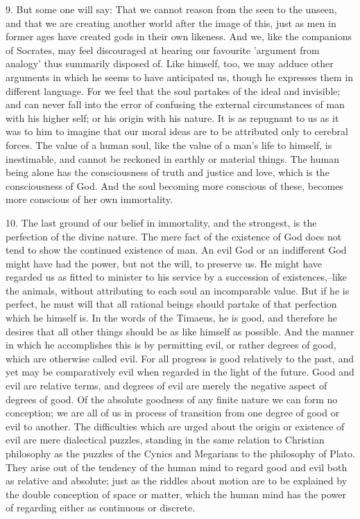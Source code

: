 9. But some one will say: That we cannot reason from the seen to the
unseen, and that we are creating another world after the image of this,
just as men in former ages have created gods in their own likeness. And
we, like the companions of Socrates, may feel discouraged at hearing
our favourite 'argument from analogy' thus summarily disposed of. Like
himself, too, we may adduce other arguments in which he seems to have
anticipated us, though he expresses them in different language. For we
feel that the soul partakes of the ideal and invisible; and can never
fall into the error of confusing the external circumstances of man with
his higher self; or his origin with his nature. It is as repugnant to
us as it was to him to imagine that our moral ideas are to be attributed
only to cerebral forces. The value of a human soul, like the value of a
man's life to himself, is inestimable, and cannot be reckoned in earthly
or material things. The human being alone has the consciousness of truth
and justice and love, which is the consciousness of God. And the soul
becoming more conscious of these, becomes more conscious of her own
immortality.

10. The last ground of our belief in immortality, and the strongest, is
the perfection of the divine nature. The mere fact of the existence of
God does not tend to show the continued existence of man. An evil God
or an indifferent God might have had the power, but not the will, to
preserve us. He might have regarded us as fitted to minister to his
service by a succession of existences,--like the animals, without
attributing to each soul an incomparable value. But if he is perfect,
he must will that all rational beings should partake of that perfection
which he himself is. In the words of the Timaeus, he is good, and
therefore he desires that all other things should be as like himself as
possible. And the manner in which he accomplishes this is by permitting
evil, or rather degrees of good, which are otherwise called evil.
For all progress is good relatively to the past, and yet may be
comparatively evil when regarded in the light of the future. Good and
evil are relative terms, and degrees of evil are merely the negative
aspect of degrees of good. Of the absolute goodness of any finite nature
we can form no conception; we are all of us in process of transition
from one degree of good or evil to another. The difficulties which
are urged about the origin or existence of evil are mere dialectical
puzzles, standing in the same relation to Christian philosophy as the
puzzles of the Cynics and Megarians to the philosophy of Plato. They
arise out of the tendency of the human mind to regard good and evil both
as relative and absolute; just as the riddles about motion are to be
explained by the double conception of space or matter, which the human
mind has the power of regarding either as continuous or discrete.

